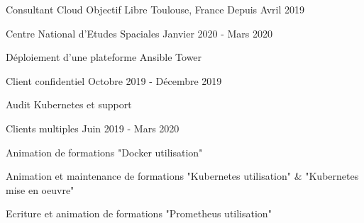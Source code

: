 

\begin{cventries}

  \cventry
    {Consultant Cloud} %
    {Objectif Libre} %
    {Toulouse, France} %
    {Depuis Avril 2019} %
    {
      \begin{cvsubentries}
        \cvsubentry
          {}
          {Centre National d'Etudes Spaciales}
          {Janvier 2020 - Mars 2020}
          {
            \begin{cvitems} %
              \item {Déploiement d'une plateforme Ansible Tower}
            \end{cvitems}
          }
        \cvsubentry
          {}
          {Client confidentiel}
          {Octobre 2019 - Décembre 2019}
          {
            \begin{cvitems} %
              \item {Audit Kubernetes et support}
            \end{cvitems}
          }
        \cvsubentry
          {}
          {Clients multiples}
          {Juin 2019 - Mars 2020}
          {
            \begin{cvitems} %
              \item {Animation de formations "Docker utilisation"}
              \item {Animation et maintenance de formations "Kubernetes utilisation" \& "Kubernetes mise en oeuvre"}
              \item {Ecriture et animation de formations "Prometheus utilisation"}
            \end{cvitems}
          }
      \end{cvsubentries}
    }


\end{cventries}
